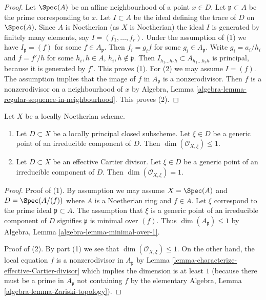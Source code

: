 \begin{proof}
Let $\Spec(A)$ be an affine neighbourhood of a point $x \in D$.
Let $\mathfrak p \subset A$ be the prime corresponding to $x$.
Let $I \subset A$ be the ideal defining the trace of $D$ on
$\Spec(A)$. Since $A$ is Noetherian (as $X$ is Noetherian)
the ideal $I$ is generated by finitely many elements, say
$I = (f_1, \ldots, f_r)$. Under the assumption of (1) we have
$I_\mathfrak p = (f)$ for some $f \in A_\mathfrak p$.
Then $f_i = g_i f$ for some $g_i \in A_\mathfrak p$.
Write $g_i = a_i/h_i$ and $f = f'/h$ for some
$h_i, h \in A$, $h_i, h \not \in \mathfrak p$.
Then $I_{h_1 \ldots h_r h} \subset A_{h_1 \ldots h_r h}$ is
principal, because it is generated by $f'$. This proves (1).
For (2) we may assume $I = (f)$. The assumption implies
that the image of $f$ in $A_\mathfrak p$ is a nonzerodivisor.
Then $f$ is a nonzerodivisor on a neighbourhood of $x$ by
Algebra, Lemma \ref{algebra-lemma-regular-sequence-in-neighbourhood}.
This proves (2).
\end{proof}

\begin{lemma}
\label{lemma-effective-Cartier-codimension-1}
Let $X$ be a locally Noetherian scheme.
\begin{enumerate}
\item Let $D \subset X$ be a locally principal closed subscheme.
Let $\xi \in D$ be a generic point of an irreducible component of $D$.
Then $\dim(\mathcal{O}_{X, \xi}) \leq 1$.
\item Let $D \subset X$ be an effective Cartier divisor.
Let $\xi \in D$ be a generic point of an irreducible component of $D$.
Then $\dim(\mathcal{O}_{X, \xi}) = 1$.
\end{enumerate}
\end{lemma}

\begin{proof}
Proof of (1). By assumption we may assume $X = \Spec(A)$ and
$D = \Spec(A/(f))$ where $A$ is a Noetherian ring and $f \in A$.
Let $\xi$ correspond to the prime ideal $\mathfrak p \subset A$.
The assumption that $\xi$ is a generic point of an irreducible
component of $D$ signifies $\mathfrak p$ is minimal over $(f)$.
Thus $\dim(A_\mathfrak p) \leq 1$ by
Algebra, Lemma \ref{algebra-lemma-minimal-over-1}.

\medskip\noindent
Proof of (2). By part (1) we see that $\dim(\mathcal{O}_{X, \xi}) \leq 1$.
On the other hand, the local equation $f$ is a nonzerodivisor in
$A_\mathfrak p$ by Lemma \ref{lemma-characterize-effective-Cartier-divisor}
which implies the dimension is at least $1$ (because there must be a
prime in $A_\mathfrak p$ not containing $f$ by the elementary
Algebra, Lemma \ref{algebra-lemma-Zariski-topology}).
\end{proof}

